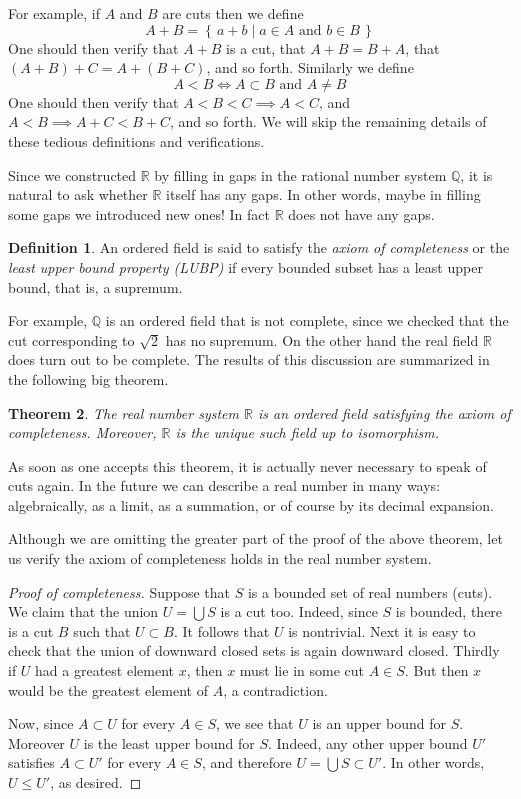 \documentclass[11pt,oneside]{amsbook}
\newcommand{\set}[1]{\left\{\,#1\,\right\}}
\newcommand{\QQ}{\mathbb Q}
\newcommand{\RR}{\mathbb R}
\theoremstyle{definition}
\theoremstyle{plain}
\newtheorem{thm}{Theorem}[section]
\theoremstyle{definition}
\newtheorem{defn}[thm]{Definition}
\theoremstyle{remark}
\numberwithin{equation}{section}
\numberwithin{figure}{section}
\begin{document}
For example, if $A$ and $B$ are cuts then we define
\[A+B=\set{a+b\mid a\in A\text{ and }b\in B}
\]
One should then verify that $A+B$ is a cut, that $A+B=B+A$, that $(A+B)+C=A+(B+C)$, and so forth. Similarly we define
\[A<B\iff A\subset B\text{ and }A\neq B
\]
One should then verify that $A<B<C\implies A<C$, and $A<B\implies A+C<B+C$, and so forth. We will skip the remaining details of these tedious definitions and verifications.

Since we constructed $\RR$ by filling in gaps in the rational number system $\QQ$, it is natural to ask whether $\RR$ itself has any gaps. In other words, maybe in filling some gaps we introduced new ones! In fact $\RR$ does not have any gaps.

\begin{defn}
  An ordered field is said to satisfy the \emph{axiom of completeness} or the \emph{least upper bound property (LUBP)} if every bounded subset has a least upper bound, that is, a supremum.
\end{defn}

For example, $\QQ$ is an ordered field that is not complete, since we checked that the cut corresponding to $\sqrt2$ has no supremum. On the other hand the real field $\RR$ does turn out to be complete. The results of this discussion are summarized in the following big theorem.

\begin{thm}
  The real number system $\RR$ is an ordered field satisfying the axiom of completeness. Moreover, $\RR$ is the unique such field up to isomorphism.
\end{thm}

As soon as one accepts this theorem, it is actually never necessary to speak of cuts again. In the future we can describe a real number in many ways: algebraically, as a limit, as a summation, or of course by its decimal expansion.

Although we are omitting the greater part of the proof of the above theorem, let us verify the axiom of completeness holds in the real number system.

\begin{proof}[Proof of completeness]
  Suppose that $S$ is a bounded set of real numbers (cuts). We claim that the union $U=\bigcup S$ is a cut too. Indeed, since $S$ is bounded, there is a cut $B$ such that  $U\subset B$. It follows that $U$ is nontrivial. Next it is easy to check that the union of downward closed sets is again downward closed. Thirdly if $U$ had a greatest element $x$, then $x$ must lie in some cut $A\in S$. But then $x$ would be the greatest element of $A$, a contradiction.

  Now, since $A\subset U$ for every $A\in S$, we see that $U$ is an upper bound for $S$. Moreover $U$ is the least upper bound for $S$. Indeed, any other upper bound $U'$ satisfies $A\subset U'$ for every $A\in S$, and therefore $U=\bigcup S\subset U'$. In other words, $U\leq U'$, as desired.
\end{proof}
\end{document}
